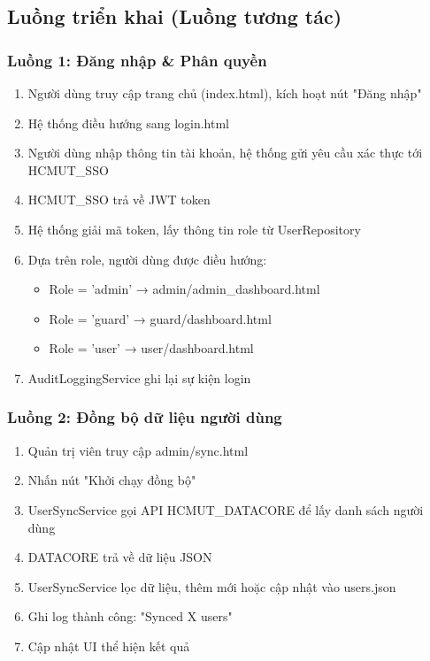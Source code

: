 \subsection{Luồng triển khai (Luồng tương tác)}

\subsubsection{Luồng 1: Đăng nhập \& Phân quyền}

\begin{enumerate}
    \item Người dùng truy cập trang chủ (index.html), kích hoạt nút "Đăng nhập"
    \item Hệ thống điều hướng sang login.html
    \item Người dùng nhập thông tin tài khoản, hệ thống gửi yêu cầu xác thực tới HCMUT\_SSO
    \item HCMUT\_SSO trả về JWT token
    \item Hệ thống giải mã token, lấy thông tin role từ UserRepository
    \item Dựa trên role, người dùng được điều hướng:
    \begin{itemize}
        \item Role = 'admin' → admin/admin\_dashboard.html
        \item Role = 'guard' → guard/dashboard.html
        \item Role = 'user' → user/dashboard.html
    \end{itemize}
    \item AuditLoggingService ghi lại sự kiện login
\end{enumerate}

\subsubsection{Luồng 2: Đồng bộ dữ liệu người dùng}

\begin{enumerate}
    \item Quản trị viên truy cập admin/sync.html
    \item Nhấn nút "Khởi chạy đồng bộ"
    \item UserSyncService gọi API HCMUT\_DATACORE để lấy danh sách người dùng
    \item DATACORE trả về dữ liệu JSON
    \item UserSyncService lọc dữ liệu, thêm mới hoặc cập nhật vào users.json
    \item Ghi log thành công: "Synced X users"
    \item Cập nhật UI thể hiện kết quả
\end{enumerate}

